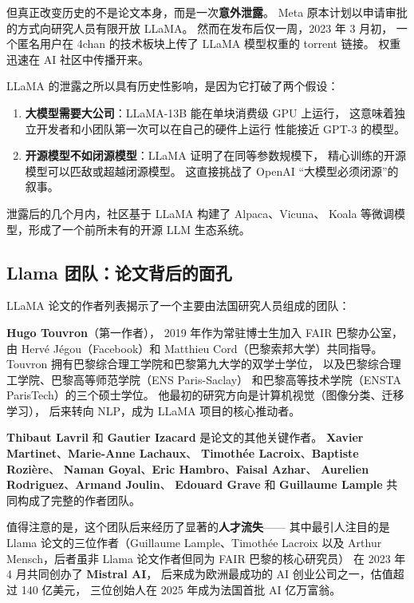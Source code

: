 但真正改变历史的不是论文本身，而是一次\textbf{意外泄露}。
Meta 原本计划以申请审批的方式向研究人员有限开放 LLaMA。
然而在发布后仅一周，2023 年 3 月初，
一个匿名用户在 4chan 的技术板块上传了 LLaMA 模型权重的 torrent 链接。
权重迅速在 AI 社区中传播开来。

\begin{whybox}[泄露为什么改变了一切？]
LLaMA 的泄露之所以具有历史性影响，是因为它打破了两个假设：
\begin{enumerate}
  \item \textbf{大模型需要大公司}：LLaMA-13B 能在单块消费级 GPU 上运行，
    这意味着独立开发者和小团队第一次可以在自己的硬件上运行
    性能接近 GPT-3 的模型。
  \item \textbf{开源模型不如闭源模型}：LLaMA 证明了在同等参数规模下，
    精心训练的开源模型可以匹敌或超越闭源模型。
    这直接挑战了 OpenAI ``大模型必须闭源''的叙事。
\end{enumerate}
泄露后的几个月内，社区基于 LLaMA 构建了 Alpaca、Vicuna、
Koala 等微调模型，形成了一个前所未有的开源 LLM 生态系统。
\end{whybox}

\subsection{Llama 团队：论文背后的面孔}

LLaMA 论文的作者列表揭示了一个主要由法国研究人员组成的团队：

\textbf{Hugo Touvron}（第一作者），
2019 年作为常驻博士生加入 FAIR 巴黎办公室，
由 Herv\'e J\'egou（Facebook）和 Matthieu Cord（巴黎索邦大学）共同指导。
Touvron 拥有巴黎综合理工学院和巴黎第九大学的双学士学位，
以及巴黎综合理工学院、巴黎高等师范学院（ENS Paris-Saclay）
和巴黎高等技术学院（ENSTA ParisTech）的三个硕士学位。
他最初的研究方向是计算机视觉（图像分类、迁移学习），
后来转向 NLP，成为 LLaMA 项目的核心推动者。

\textbf{Thibaut Lavril} 和 \textbf{Gautier Izacard} 是论文的其他关键作者。
\textbf{Xavier Martinet}、\textbf{Marie-Anne Lachaux}、
\textbf{Timoth\'ee Lacroix}、\textbf{Baptiste Rozi\`ere}、
\textbf{Naman Goyal}、\textbf{Eric Hambro}、\textbf{Faisal Azhar}、
\textbf{Aurelien Rodriguez}、\textbf{Armand Joulin}、
\textbf{Edouard Grave} 和 \textbf{Guillaume Lample}
共同构成了完整的作者团队。

值得注意的是，这个团队后来经历了显著的\textbf{人才流失}——
其中最引人注目的是 Llama 论文的三位作者（Guillaume Lample、Timoth\'ee Lacroix
以及 Arthur Mensch，后者虽非 Llama 论文作者但同为 FAIR 巴黎的核心研究员）
在 2023 年 4 月共同创办了 \textbf{Mistral AI}，
后来成为欧洲最成功的 AI 创业公司之一，估值超过 140 亿美元，
三位创始人在 2025 年成为法国首批 AI 亿万富翁。

